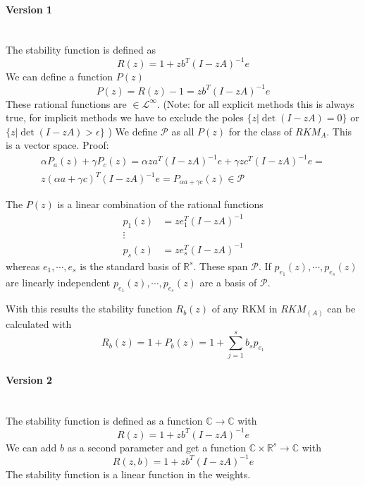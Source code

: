 \documentclass[a4paper]{article}
\numberwithin{equation}{section}
\theoremstyle{plain}
\theoremstyle{definition}
\numberwithin{theorem}{section}
\newcommand{\R}{\mathbb{R}}
\newcommand{\CN}{\mathbb{C}}
\newcommand{\1}{\mathbbm{1}}
\begin{document}
\paragraph*{Version 1} $ $\\

The stability function is defined as 
\begin{equation}\label{eq:stab_func}
R(z) = 1 + zb^T(I - zA)^{-1}e
\end{equation}
We can define a function $P(z)$
\begin{equation}
P(z) = R(z)-1 = z b^T (I - zA)^{-1} e
\end{equation}
These rational functions are $\in \mathcal{L}^\infty$. (Note: for all explicit methods this is always true, for implicit methods we have to exclude the poles $\{z | \det(I - zA) = 0\}$ or  $\{z | \det(I - zA) > \epsilon \}$ )
We define $\mathcal{P}$ as all $P(z)$ for the class of $RKM_A$. 
This is a vector space.
Proof:
\begin{multline}
\alpha P_a(z) + \gamma P_c(z) =  \alpha z a^T (I - zA)^{-1} e + \gamma z c^T (I - zA)^{-1} e=\\
z (\alpha a+ \gamma c)^T (I - zA)^{-1} e= P_{\alpha a + \gamma c}(z) \in \mathcal{P}
\end{multline}

The $P(z)$ is a linear combination of the rational functions
\begin{subequations}
\begin{align}
p_1(z) &= z e_1^T (I - zA)^{-1}\\
\vdots \\
p_s(z) &= z e_s^T (I - zA)^{-1}
\end{align}
\end{subequations}
whereas $e_1,\cdots,e_s$ is the standard basis of $\R^s$.
These span $\mathcal{P}$. If $p_{e_1}(z),\cdots,p_{e_s}(z)$ are linearly independent $p_{e_1}(z),\cdots,p_{e_s}(z)$ are a basis of $\mathcal{P}$.

With this results the stability function $R_b(z)$ of any RKM in $RKM_{(A)}$ can be calculated with 
\begin{equation}
R_b(z) = 1 + P_b(z) = 1 + \sum_{j = 1}^s b_s p_{e_1}
\end{equation}




\paragraph*{Version 2} $ $\\
The stability function is defined as a function $\CN \to \CN$ with 
\begin{equation}
R(z) = 1 + zb^T(I - zA)^{-1}e
\end{equation}
We can add $b$ as a second parameter and get a function $\CN \times \R^s \to \CN$ with
\begin{equation}
R(z,b) = 1 + zb^T(I - zA)^{-1}e
\end{equation}
The stability function is a linear function in the weights.
\end{document}

